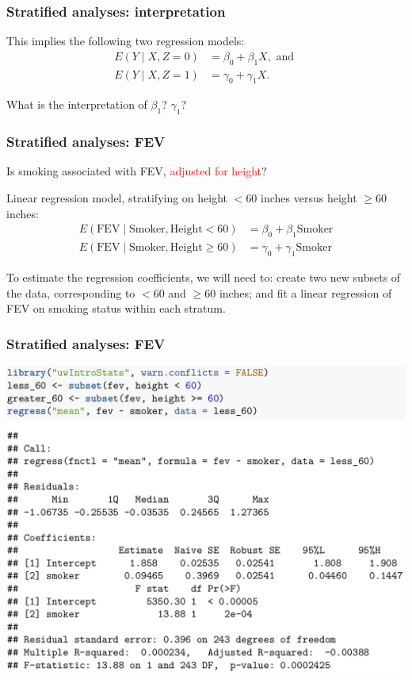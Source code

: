 \documentclass[12pt, 
hyperref={colorlinks=true, linkcolor=blue, urlcolor=cyan}]{beamer}
\begin{document}
\begin{frame}
\frametitle{Stratified analyses: interpretation}
\vspace{-2cm}This implies the following two regression models:
\begin{align*}
E(Y \mid X, Z = 0) &= \beta_0 + \beta_1 X, \text{ and } \\
E(Y \mid X, Z = 1) &= \gamma_0 + \gamma_1 X.
\end{align*}

What is the interpretation of $\beta_1$? $\gamma_1$?
\end{frame}

\begin{frame}
\frametitle{Stratified analyses: FEV}

Is smoking associated with FEV, \textcolor{red}{adjusted for height}?

Linear regression model, stratifying on height $< 60$ inches versus height $\geq 60$ inches:
\begin{align*}
E(\text{FEV} \mid \text{Smoker}, \text{Height} < 60) &= \beta_0 + \beta_1 \text{Smoker} \\
E(\text{FEV} \mid \text{Smoker}, \text{Height} \geq 60) &= \gamma_0 + \gamma_1 \text{Smoker} 
\end{align*}

To estimate the regression coefficients, we will need to: create two new subsets of the data, corresponding to $< 60$ and $\geq 60$ inches; and fit a linear regression of FEV on smoking status within each stratum.
\end{frame}

\begin{frame}
\frametitle{Stratified analyses: FEV}

\includegraphics[width=1\textwidth]{plots/fev_vs_smoke_stratified_less_60.png}

\end{frame}
\end{document}
